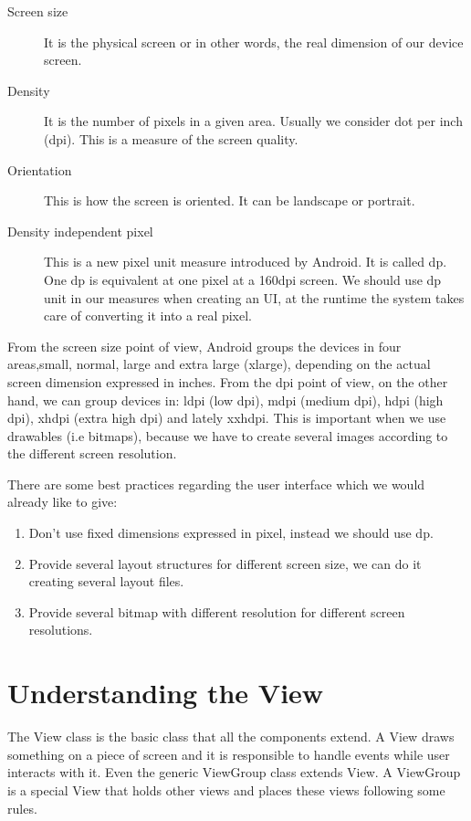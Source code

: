 \begin{description}
	\item[Screen size] It is the physical screen or in other words, the real dimension of our device screen.
	\item[Density] It is the number of pixels in a given area. Usually we consider dot per inch (dpi). This is a measure of the screen
	quality.
	\item[Orientation] This is how the screen is oriented. It can be landscape or portrait.
	\item[Density independent pixel] This is a new pixel unit measure introduced by Android. It is called dp. One dp is equivalent at
	one pixel at a 160dpi screen. We should use dp unit in our measures when creating an UI, at the runtime the system takes care of
	converting it into a real pixel.
\end{description}

From the screen size point of view, Android groups the devices in four areas,small, normal, large and extra large (xlarge),
depending on the actual screen dimension expressed in inches. From the dpi point of view, on the other hand, we can group
devices in: ldpi (low dpi), mdpi (medium dpi), hdpi (high dpi), xhdpi (extra high dpi) and lately xxhdpi. This is important when
we use drawables (i.e bitmaps), because we have to create several images according to the different screen resolution.

There are some best practices regarding the user interface which we would already like to give:

\begin{framed}
	
	
	\begin{enumerate}
		\item Don’t use fixed dimensions expressed in pixel, instead we should use dp.
		\item Provide several layout structures for different screen size, we can do it creating several layout files.
		\item Provide several bitmap with different resolution for different screen resolutions. 
	\end{enumerate}

\end{framed}



\section{Understanding the View}
The View class is the basic class that all the components extend. A View draws something on a piece of screen and it is
responsible to handle events while user interacts with it. Even the generic ViewGroup class extends View. A ViewGroup
is a special View that holds other views and places these views following some rules.


